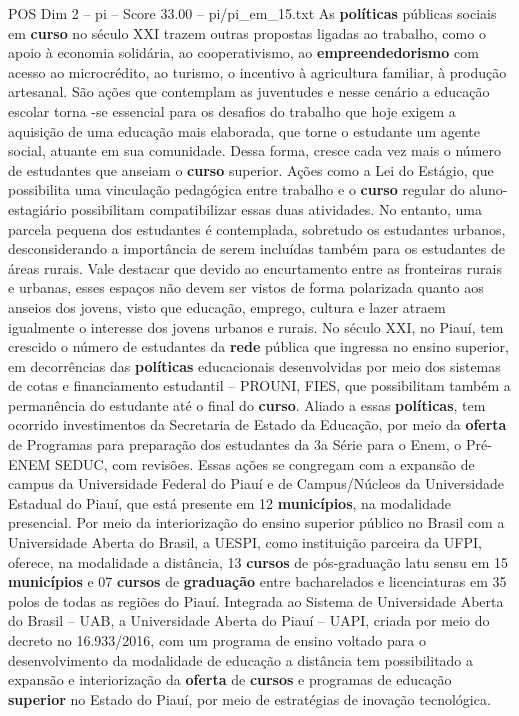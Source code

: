 \begin{textsample}{POS Dim 2 – pi – Score 33.00 – pi/pi\_em\_15.txt}
As \textbf{políticas} públicas sociais em \textbf{curso} no século XXI trazem outras propostas ligadas ao trabalho, como o apoio à economia solidária, ao cooperativismo, ao \textbf{empreendedorismo} com acesso ao microcrédito, ao turismo, o incentivo à agricultura familiar, à produção artesanal.
São ações que contemplam as juventudes e nesse cenário a educação escolar torna -se essencial para os desafios do trabalho que hoje exigem a aquisição de uma educação mais elaborada, que torne o estudante um agente social, atuante em sua comunidade.
Dessa forma, cresce cada vez mais o número de estudantes que anseiam o \textbf{curso} superior.
Ações como a Lei do Estágio, que possibilita uma vinculação pedagógica entre trabalho e o \textbf{curso} regular do aluno-estagiário possibilitam compatibilizar essas duas atividades.
No entanto, uma parcela pequena dos estudantes é contemplada, sobretudo os estudantes urbanos, desconsiderando a importância de serem incluídas também para os estudantes de áreas rurais.
Vale destacar que devido ao encurtamento entre as fronteiras rurais e urbanas, esses espaços não devem ser vistos de forma polarizada quanto aos anseios dos jovens, visto que educação, emprego, cultura e lazer atraem igualmente o interesse dos jovens urbanos e rurais.
No século XXI, no Piauí, tem crescido o número de estudantes da \textbf{rede} pública que ingressa no ensino superior, em decorrências das \textbf{políticas} educacionais desenvolvidas por meio dos sistemas de cotas e financiamento estudantil – PROUNI, FIES, que possibilitam também a permanência do estudante até o final do \textbf{curso}.
Aliado a essas \textbf{políticas}, tem ocorrido investimentos da Secretaria de Estado da Educação, por meio da \textbf{oferta} de Programas para preparação dos estudantes da 3a Série para o Enem, o Pré-ENEM SEDUC, com revisões.
Essas ações se congregam com a expansão de campus da Universidade Federal do Piauí e de Campus/Núcleos da Universidade Estadual do Piauí, que está presente em 12 \textbf{municípios}, na modalidade presencial.
Por meio da interiorização do ensino superior público no Brasil com a Universidade Aberta do Brasil, a UESPI, como instituição parceira da UFPI, oferece, na modalidade a distância, 13 \textbf{cursos} de pós-graduação latu sensu em 15 \textbf{municípios} e 07 \textbf{cursos} de \textbf{graduação} entre bacharelados e licenciaturas em 35 polos de todas as regiões do Piauí.
Integrada ao Sistema de Universidade Aberta do Brasil – UAB, a Universidade Aberta do Piauí – UAPI, criada por meio do decreto no 16.933/2016, com um programa de ensino voltado para o desenvolvimento da modalidade de educação a distância tem possibilitado a expansão e interiorização da \textbf{oferta} de \textbf{cursos} e programas de educação \textbf{superior} no Estado do Piauí, por meio de estratégias de inovação tecnológica.

\end{textsample}
